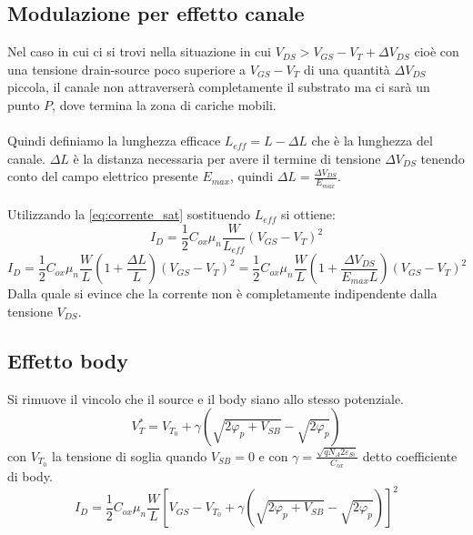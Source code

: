 \documentclass{article}
\begin{document}
\subsection*{Modulazione per effetto canale}
Nel caso in cui ci si trovi nella situazione in cui $V_{DS} > V_{GS} - V_T + \Delta V_{DS}$ cioè con una tensione drain-source poco superiore a $V_{GS} - V_T$ di una quantità $\Delta V_{DS}$ piccola, il canale non attraverserà completamente il substrato ma ci sarà un punto $P$, dove termina la zona di cariche mobili.\\
\\
Quindi definiamo la lunghezza efficace $L_{eff} = L - \Delta L$ che è la lunghezza del canale. $\Delta L$ è la distanza necessaria per avere il termine di tensione $\Delta V_{DS}$ tenendo conto del campo elettrico presente $E_{max}$, quindi $\Delta L = \frac{\Delta V_{DS}}{E_{max}}$.\\
\\
Utilizzando la \eqref{eq:corrente_sat} sostituendo $L_{eff}$ si ottiene:
\begin{equation*}
I_D = \frac{1}{2} C_{ox} \mu_n \frac{W}{L_{eff}} (V_{GS} - V_T)^2
\end{equation*}
\begin{equation*}
I_D = \frac{1}{2} C_{ox} \mu_n \frac{W}{L} \left(1+\frac{\Delta L}{L} \right) (V_{GS} - V_T)^2 = \frac{1}{2} C_{ox} \mu_n \frac{W}{L} \left(1+\frac{\Delta V_{DS}}{E_{max} L} \right) (V_{GS} - V_T)^2
\end{equation*}
Dalla quale si evince che la corrente non è completamente indipendente dalla tensione $V_{DS}$.

\subsection*{Effetto body}
Si rimuove il vincolo che il source e il body siano allo stesso potenziale.
\begin{equation*}
V_T^* = V_{T_0} + \gamma \left( \sqrt{2\varphi_p + V_{SB}} - \sqrt{2\varphi_p} \right)
\end{equation*}
con $V_{T_0}$ la tensione di soglia quando $V_{SB} = 0$ e con $\gamma = \frac{\sqrt{qN_A 2\varepsilon_{Si}}}{C_{ox}}$ detto coefficiente di body.
\begin{equation*}
I_D = \frac{1}{2} C_{ox} \mu_n \frac{W}{L} \left[ V_{GS} - V_{T_0} + \gamma \left( \sqrt{2\varphi_p + V_{SB}} - \sqrt{2\varphi_p} \right) \right]^2
\end{equation*}
\end{document}
